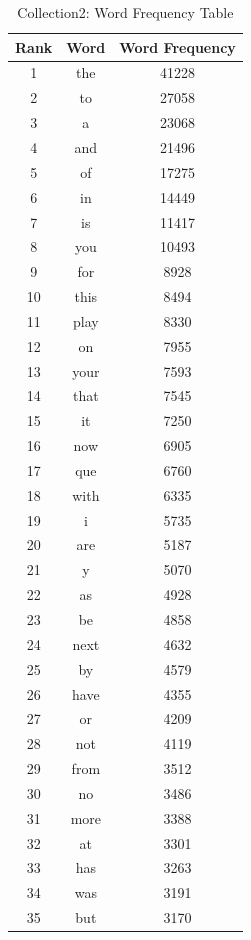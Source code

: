 \begin{enumerate}
	\begin{table}
		\caption{Collection2: Word Frequency Table}
			\begin{center}
				\begin{tabular}{ c | c | c }
					\hline
Rank & Word & Word Frequency \\ \hline
1 & the & 41228 \\ \hline
2 & to & 27058 \\ \hline
3 & a & 23068 \\ \hline
4 & and & 21496 \\ \hline
5 & of & 17275 \\ \hline
6 & in & 14449 \\ \hline
7 & is & 11417 \\ \hline
8 & you & 10493 \\ \hline
9 & for & 8928 \\ \hline
10 & this & 8494 \\ \hline
11 & play & 8330 \\ \hline
12 & on & 7955 \\ \hline
13 & your & 7593 \\ \hline
14 & that & 7545 \\ \hline
15 & it & 7250 \\ \hline
16 & now & 6905 \\ \hline
17 & que & 6760 \\ \hline
18 & with & 6335 \\ \hline
19 & i & 5735 \\ \hline
20 & are & 5187 \\ \hline
21 & y & 5070 \\ \hline
22 & as & 4928 \\ \hline
23 & be & 4858 \\ \hline
24 & next & 4632 \\ \hline
25 & by & 4579 \\ \hline
26 & have & 4355 \\ \hline
27 & or & 4209 \\ \hline
28 & not & 4119 \\ \hline
29 & from & 3512 \\ \hline
30 & no & 3486 \\ \hline
31 & more & 3388 \\ \hline
32 & at & 3301 \\ \hline
33 & has & 3263 \\ \hline
34 & was & 3191 \\ \hline
35 & but & 3170 \\ \hline

\end{tabular}
\end{center}
\end{table}
\end{enumerate}

